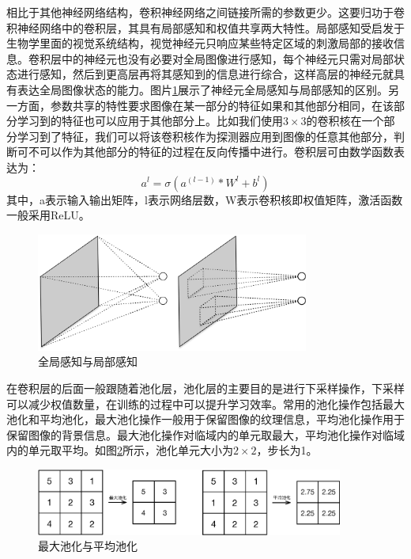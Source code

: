 相比于其他神经网络结构，卷积神经网络之间链接所需的参数更少。这要归功于卷积神经网络中的卷积层，其具有局部感知和权值共享两大特性。局部感知受启发于生物学里面的视觉系统结构，视觉神经元只响应某些特定区域的刺激局部的接收信息。卷积层中的神经元也没有必要对全局图像进行感知，每个神经元只需对局部状态进行感知，然后到更高层再将其感知到的信息进行综合，这样高层的神经元就具有表达全局图像状态的能力。图片\ref{fig:cnn}展示了神经元全局感知与局部感知的区别。另一方面，参数共享的特性要求图像在某一部分的特征如果和其他部分相同，在该部分学习到的特征也可以应用于其他部分上。比如我们使用$3 \times 3$的卷积核在一个部分学习到了特征，我们可以将该卷积核作为探测器应用到图像的任意其他部分，判断可不可以作为其他部分的特征的过程在反向传播中进行。卷积层可由数学函数表达为：
\begin{equation}
 a^l= \sigma(a^(l-1) * W^l + b^l)
\end{equation}
其中，a表示输入输出矩阵，l表示网络层数，W表示卷积核即权值矩阵，激活函数一般采用ReLU。
\begin{figure}[thb]
\begin{center}
\includegraphics[width=0.8\textwidth]{figures/cnn.eps}
\caption{全局感知与局部感知}\label{fig:cnn}
\end{center}
\end{figure}

在卷积层的后面一般跟随着池化层，池化层的主要目的是进行下采样操作，下采样可以减少权值数量，在训练的过程中可以提升学习效率。常用的池化操作包括最大池化和平均池化，最大池化操作一般用于保留图像的纹理信息，平均池化操作用于保留图像的背景信息。最大池化操作对临域内的单元取最大，平均池化操作对临域内的单元取平均。如图\ref{fig:pooling}所示，池化单元大小为$2 \times 2$，步长为1。
\begin{figure}[thb]
\begin{center}
\includegraphics[width=0.9\textwidth]{figures/pooling.eps}
\caption{最大池化与平均池化}\label{fig:pooling}
\end{center}
\end{figure}

